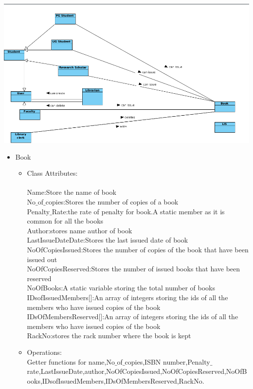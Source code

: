 \documentclass{article}
\begin{document}
\includegraphics[scale=0.50]{images/classDiagNaive.png}
\begin{itemize}

\item Book
\begin{itemize}
\item Class Attributes:\\
\\Name:Store the name of book
\\No$\_$of$\_$copies:Stores the number of copies of a book
\\Penalty$\_$Rate:the rate of penalty for book.A static member as it is common for all the books
\\Author:stores name  author of book 
\\LastIssueDateDate:Stores the last issued date of book
\\NoOfCopiesIssued:Stores the number of copies of the book that have been issued out
\\NoOfCopiesReserved:Stores the number of issued books that have been reserved
\\NoOfBooks:A static variable storing the total number of books
\\IDsofIssuedMembers[]:An array of integers storing the ids of all the members who have issued copies of the book
\\IDsOfMembersReserved[]:An array of integers storing the ids of all the members who have issued copies of the book
\\RackNo:stores the rack number where the book is kept

\item Operations:
\\Getter functions for name,No$\_$of$\_$copies,ISBN number,Penalty$\_$rate,LastIssueDate,author,NoOfCopiesIssued,NoOfCopiesReserved,NoOfBooks,IDsofIssuedMembers,IDsOfMembersReserved,RackNo.


\end{itemize}
\end{itemize}
\end{document}

